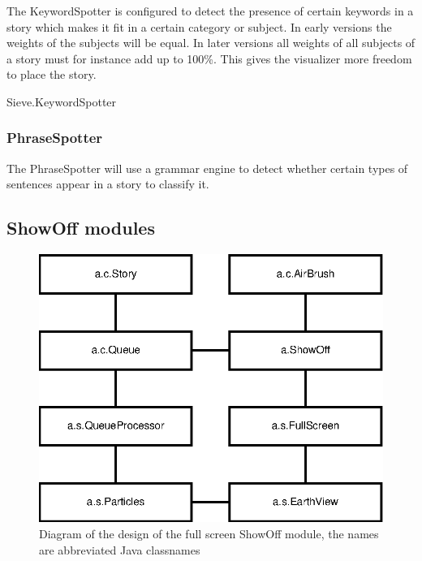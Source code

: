 The KeywordSpotter is configured to detect the presence of certain keywords in
a story which makes it fit in a certain category or subject. In early versions
the weights of the subjects will be equal. In later versions all weights of all
subjects of a story must for instance add up to 100\%. This gives the
visualizer more freedom to place the story.

\begin{module}{Sieve.KeywordSpotter}
\end{module}

\subsubsection{PhraseSpotter}

The PhraseSpotter will use a grammar engine to detect whether certain types of
sentences appear in a story to classify it.


\subsection{ShowOff modules}

\begin{figure}
    \centering
    \includegraphics{image/showoff-fullscreen}
    \caption{Diagram of the design of the full screen ShowOff module, the names are abbreviated Java classnames}
\end{figure}

